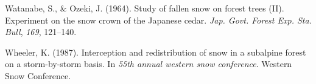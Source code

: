 \documentclass[
  letterpaper,
  DIV=11,
  numbers=noendperiod]{scrartcl}
\newlength{\cslhangindent}
\newenvironment{CSLReferences}[2] %
 {\begin{list}{}{%
  \setlength{\itemindent}{0pt}
  \setlength{\leftmargin}{0pt}
  \setlength{\parsep}{0pt}
  \ifodd #1
   \setlength{\leftmargin}{\cslhangindent}
   \setlength{\itemindent}{-1\cslhangindent}
  \fi
  \setlength{\itemsep}{#2\baselineskip}}}
 {\end{list}}
\begin{document}
\begin{CSLReferences}{1}{0}
Watanabe, S., \& Ozeki, J. (1964). Study of fallen snow on forest trees
({II}). {Experiment} on the snow crown of the {Japanese} cedar.
\emph{Jap. Govt. Forest Exp. Sta. Bull}, \emph{169}, 121--140.

Wheeler, K. (1987). Interception and redistribution of snow in a
subalpine forest on a storm-by-storm basis. In \emph{55th annual western
snow conference}. Western Snow Conference.

\end{CSLReferences}
\end{document}

